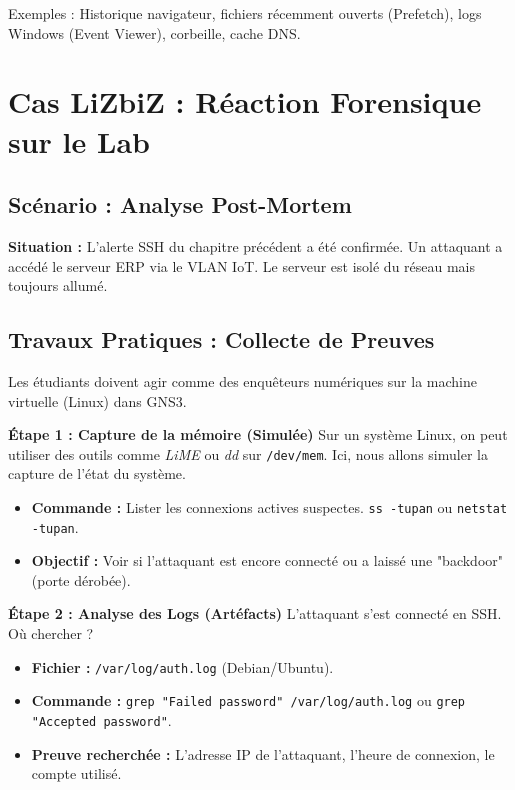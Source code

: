 Exemples : Historique navigateur, fichiers récemment ouverts (Prefetch), logs Windows (Event Viewer), corbeille, cache DNS.

\section{Cas LiZbiZ : Réaction Forensique sur le Lab}

\subsection{Scénario : Analyse Post-Mortem}

\begin{boxlizbiz}
\textbf{Situation :} L'alerte SSH du chapitre précédent a été confirmée. Un attaquant a accédé le serveur ERP via le VLAN IoT. Le serveur est isolé du réseau mais toujours allumé.
\end{boxlizbiz}

\subsection{Travaux Pratiques : Collecte de Preuves}

Les étudiants doivent agir comme des enquêteurs numériques sur la machine virtuelle (Linux) dans GNS3.

\textbf{Étape 1 : Capture de la mémoire (Simulée)}
Sur un système Linux, on peut utiliser des outils comme \textit{LiME} ou \textit{dd} sur \texttt{/dev/mem}. Ici, nous allons simuler la capture de l'état du système.
\begin{itemize}
    \item \textbf{Commande :} Lister les connexions actives suspectes.
    \texttt{ss -tupan} ou \texttt{netstat -tupan}.
    \item \textbf{Objectif :} Voir si l'attaquant est encore connecté ou a laissé une "backdoor" (porte dérobée).
\end{itemize}

\textbf{Étape 2 : Analyse des Logs (Artéfacts)}
L'attaquant s'est connecté en SSH. Où chercher ?
\begin{itemize}
    \item \textbf{Fichier :} \texttt{/var/log/auth.log} (Debian/Ubuntu).
    \item \textbf{Commande :} \texttt{grep "Failed password" /var/log/auth.log} ou \texttt{grep "Accepted password"}.
    \item \textbf{Preuve recherchée :} L'adresse IP de l'attaquant, l'heure de connexion, le compte utilisé.
\end{itemize}

